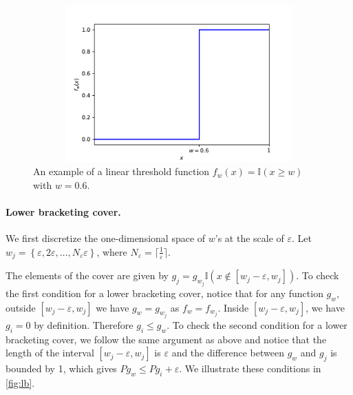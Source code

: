 \documentclass[twoside]{article}
\newcommand{\set}[1]{\left\{#1\right\}}
\newcommand{\I}{\mathbb{I}}
\begin{document}
\begin{figure}
    \centering
    \includegraphics[width=12cm, height=6cm]{figures/threshold_fn.pdf}
     \caption{An example of a linear threshold function $f_w(x) = \I(x \ge w)$ with $w = 0.6$.}
    \label{fig:thresh-fn}
\end{figure}

\paragraph{Lower bracketing cover.}
We first discretize the one-dimensional space of $w$'s at the scale of $\varepsilon$. Let $w_j = \set{\varepsilon, 2\varepsilon, \dots, N_{\varepsilon}\varepsilon}$, where $N_{\varepsilon} = \lceil \frac{1}{\varepsilon} \rceil$.

The elements of the cover are given by $g_j = g_{w_j}\I( x \notin [w_j-\varepsilon, w_j])$. To check the first condition for a lower bracketing cover, notice that for any function $g_{w}$, outside $[w_j-\varepsilon, w_j]$ we have $g_w = g_{w_j}$  as $f_w = f_{w_j}$. Inside $[w_j-\varepsilon, w_j]$, we have $g_i = 0$ by definition. Therefore $g_i \le g_w$. To check the second condition for a lower bracketing cover, we follow the same argument as above and notice that the length of the interval $[w_j-\varepsilon, w_j]$ is $\varepsilon$ and the difference between $g_w$ and $g_j$ is bounded by 1, which gives $Pg_w \le Pg_i + \varepsilon$. We illustrate these conditions in \cref{fig:lb}.
\end{document}

